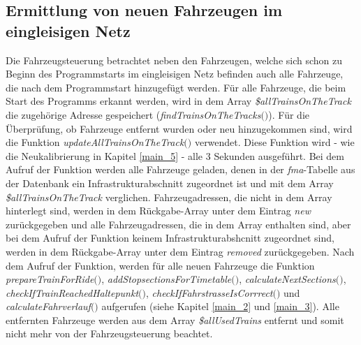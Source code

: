 \subsection{Ermittlung von neuen Fahrzeugen im eingleisigen Netz} \label{main_6}
Die Fahrzeugsteuerung betrachtet neben den Fahrzeugen, welche sich schon zu Beginn des Programmstarts im eingleisigen Netz befinden auch alle Fahrzeuge, die nach dem Programmstart hinzugefügt werden. Für alle Fahrzeuge, die beim Start des Programms erkannt werden, wird in dem Array \textit{\$allTrainsOnTheTrack} die zugehörige Adresse gespeichert (\textit{find\-Trains\-On\-The\-Tracks$($$)$}). Für die Überprüfung, ob Fahrzeuge entfernt wurden oder neu hinzugekommen sind, wird die Funktion \textit{updateAllTrainsOnTheTrack$($$)$} verwendet. Diese Funktion wird - wie die Neukalibrierung in Kapitel \ref{main_5} - alle 3 Sekunden ausgeführt. Bei dem Aufruf der Funktion werden alle Fahrzeuge geladen, denen in der \textit{fma}-Tabelle aus der Datenbank ein Infrastrukturabschnitt zugeordnet ist und mit dem Array \textit{\$allTrainsOnTheTrack} verglichen. Fahrzeugadressen, die nicht in dem Array hinterlegt sind, werden in dem Rückgabe-Array unter dem Eintrag \textit{new} zurückgegeben und alle Fahrzeugadressen, die in dem Array enthalten sind, aber bei dem Aufruf der Funktion keinem Infrastrukturabshcnitt zugeordnet sind, werden in dem Rückgabe-Array unter dem Eintrag \textit{removed} zurückgegeben. Nach dem Aufruf der Funktion, werden für alle neuen Fahrzeuge die Funktion \textit{prepare\-Train\-For\-Ride$($$)$}, \textit{add\-Stopsections\-For\-Timetable$($$)$}, \textit{calculate\-Next\-Sections$($$)$}, \textit{check\-If\-Train\-Reached\-Haltepunkt$($$)$}, \textit{check\-If\-Fahrstrasse\-Is\-Corrrect$($$)$} und \textit{calculate\-Fahrverlauf$($$)$} aufgerufen (siehe Kapitel \ref{main_2} und \ref{main_3}). Alle entfernten Fahrzeuge werden aus dem Array \textit{\$allUsedTrains} entfernt und somit nicht mehr von der Fahrzeugsteuerung beachtet. 







































